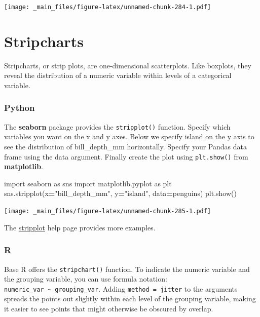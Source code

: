 \documentclass[
]{book}
\newenvironment{Shaded}{\begin{snugshade}}{\end{snugshade}}
\newcommand{\ImportTok}[1]{#1}
\newcommand{\NormalTok}[1]{#1}
\newcommand{\OperatorTok}[1]{\textcolor[rgb]{0.81,0.36,0.00}{\textbf{#1}}}
\newcommand{\StringTok}[1]{\textcolor[rgb]{0.31,0.60,0.02}{#1}}
\begin{document}
\texttt{[image: \_main\_files/figure-latex/unnamed-chunk-284-1.pdf]}

\hypertarget{stripcharts}{%
\section{Stripcharts}\label{stripcharts}}

Stripcharts, or strip plots, are one-dimensional scatterplots. Like boxplots, they reveal the distribution of a numeric variable within levels of a categorical variable.

\hypertarget{python-44}{%
\subsubsection*{Python}\label{python-44}}

The \textbf{seaborn} package provides the \texttt{stripplot()} function. Specify which variables you want on the x and y axes. Below we specify island on the y axis to see the distribution of bill\_depth\_mm horizontally. Specify your Pandas data frame using the data argument. Finally create the plot using \texttt{plt.show()} from \textbf{matplotlib}.

\begin{Shaded}
\begin{Highlighting}[]
\ImportTok{import}\NormalTok{ seaborn }\ImportTok{as}\NormalTok{ sns}
\ImportTok{import}\NormalTok{ matplotlib.pyplot }\ImportTok{as}\NormalTok{ plt}
\NormalTok{sns.stripplot(x}\OperatorTok{=}\StringTok{"bill\_depth\_mm"}\NormalTok{, y}\OperatorTok{=}\StringTok{"island"}\NormalTok{, data}\OperatorTok{=}\NormalTok{penguins)}
\NormalTok{plt.show()}
\end{Highlighting}
\end{Shaded}

\texttt{[image: \_main\_files/figure-latex/unnamed-chunk-285-1.pdf]}

The \href{https://seaborn.pydata.org/generated/seaborn.stripplot.html}{stripplot} help page provides more examples.

\hypertarget{r-44}{%
\subsubsection*{R}\label{r-44}}

Base R offers the \texttt{stripchart()} function. To indicate the numeric variable and the grouping variable, you can use formula notation: \texttt{numeric\_var\ \textasciitilde{}\ grouping\_var}. Adding \texttt{method\ =\ \textquotesingle{}jitter\textquotesingle{}} to the arguments spreads the points out slightly within each level of the grouping variable, making it easier to see points that might otherwise be obscured by overlap.
\end{document}
